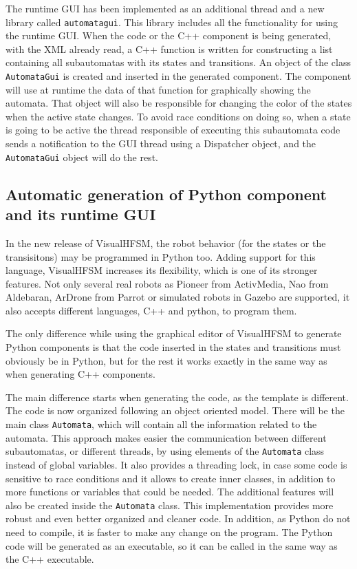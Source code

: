 \documentclass[journal,twoside]{JoPhA}
\begin{document}
The runtime GUI has been implemented as an additional thread and a new library called \texttt{automatagui}. This library includes all the functionality for using the runtime GUI. %
When the code or the C++ component is being generated, with the XML already read, a C++ function is written for constructing a list containing all subautomatas with its states and transitions. An object of the class \texttt{AutomataGui} is created and inserted in the generated component. The component will use at runtime the data of that function for graphically showing the automata. That object will also be responsible for changing the color of the states when the active state changes. To avoid race conditions on doing so, when a state is going to be active the thread responsible of executing this subautomata code sends a notification to the GUI thread using a Dispatcher object, and the \texttt{AutomataGui} object will do the rest. 

\subsection{Automatic generation of Python component and its runtime GUI}

In the new release of VisualHFSM, the robot behavior (for the states or the transisitons) may be programmed in Python too. Adding support for this language, VisualHFSM increases its flexibility, which is one of its stronger features. Not only several real robots as Pioneer from ActivMedia, Nao from Aldebaran, ArDrone from Parrot or simulated robots in Gazebo are supported, it also accepts different languages, C++ and python, to program them. 

The only difference while using the graphical editor of VisualHFSM to generate Python components is that the code inserted in the states and transitions must obviously be in Python, but for the rest it works exactly in the same way as when generating C++ components. 

The main difference starts when generating the code, as the template is different. The code is now organized following an object oriented model. There will be the main class \texttt{Automata}, which will contain all the information related to the automata. This approach makes easier the communication between different subautomatas, or different threads, by using elements of the \texttt{Automata} class instead of global variables. It also provides a threading lock, in case some code is sensitive to race conditions and it allows to create inner classes, in addition to more functions or variables that could be needed. The additional features will also be created inside the \texttt{Automata} class. This implementation provides more robust and even better organized and cleaner code. In addition, as Python do not need to compile, it is faster to make any change on the program. The Python code will be generated as an executable, so it can be called in the same way as the C++ executable.
\end{document}
